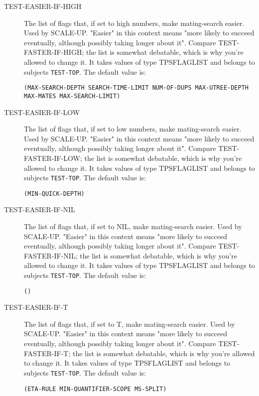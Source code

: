 \begin{description} 
\item[TEST-EASIER-IF-HIGH]  
The list of flags that, if set to high numbers, make 
mating-search easier. Used by SCALE-UP. "Easier" in this context
means "more likely to succeed eventually, although possibly
taking longer about it". Compare TEST-FASTER-IF-HIGH; the list is 
somewhat debatable, which is why you're allowed to change it.
It takes values of type TPSFLAGLIST and belongs to subjects \texttt{TEST-TOP}.  The default value is: \begin{lstlisting}
(MAX-SEARCH-DEPTH SEARCH-TIME-LIMIT NUM-OF-DUPS MAX-UTREE-DEPTH MAX-MATES MAX-SEARCH-LIMIT)
\end{lstlisting}

\item[TEST-EASIER-IF-LOW]  
The list of flags that, if set to low numbers, make 
mating-search easier. Used by SCALE-UP. "Easier" in this context
means "more likely to succeed eventually, although possibly
taking longer about it". Compare TEST-FASTER-IF-LOW; the list is 
somewhat debatable, which is why you're allowed to change it.
It takes values of type TPSFLAGLIST and belongs to subjects \texttt{TEST-TOP}.  The default value is: \begin{lstlisting}
(MIN-QUICK-DEPTH)
\end{lstlisting}

\item[TEST-EASIER-IF-NIL]  
The list of flags that, if set to NIL, make 
mating-search easier. Used by SCALE-UP. "Easier" in this context
means "more likely to succeed eventually, although possibly
taking longer about it". Compare TEST-FASTER-IF-NIL; the list is 
somewhat debatable, which is why you're allowed to change it.
It takes values of type TPSFLAGLIST and belongs to subjects \texttt{TEST-TOP}.  The default value is: \begin{lstlisting}
()
\end{lstlisting}

\item[TEST-EASIER-IF-T]  
The list of flags that, if set to T, make 
mating-search easier.  Used by SCALE-UP. "Easier" in this context
means "more likely to succeed eventually, although possibly
taking longer about it". Compare TEST-FASTER-IF-T; the list is 
somewhat debatable, which is why you're allowed to change it.
It takes values of type TPSFLAGLIST and belongs to subjects \texttt{TEST-TOP}.  The default value is: \begin{lstlisting}
(ETA-RULE MIN-QUANTIFIER-SCOPE MS-SPLIT)
\end{lstlisting}


\end{description}
